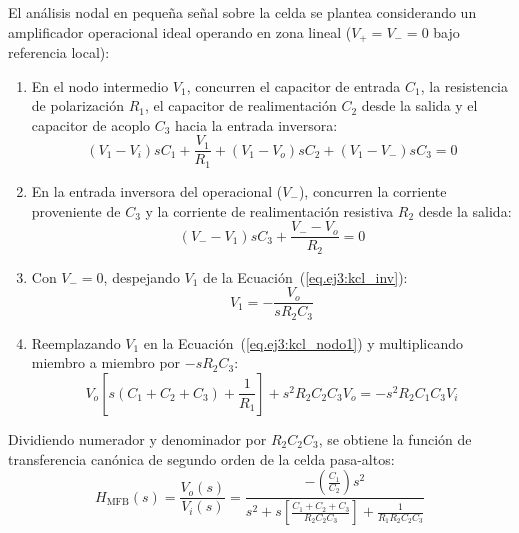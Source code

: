 El análisis nodal en pequeña señal sobre la celda se plantea considerando un amplificador operacional ideal operando en
zona lineal ($V_+ = V_- = 0$ bajo referencia local):
\begin{enumerate}
    \item En el nodo intermedio $V_1$, concurren el capacitor de entrada $C_1$, la resistencia de polarización $R_1$, el
        capacitor de realimentación $C_2$ desde la salida y el capacitor de acoplo $C_3$ hacia la entrada inversora:
        \begin{equation}
            \label{eq.ej3:kcl_nodo1}
            (V_1 - V_i) s C_1 + \frac{V_1}{R_1} + (V_1 - V_o) s C_2 + (V_1 - V_-) s C_3 = 0
        \end{equation}

    \item En la entrada inversora del operacional ($V_-$), concurren la corriente proveniente de $C_3$ y la corriente de
        realimentación resistiva $R_2$ desde la salida:
        \begin{equation}
            \label{eq.ej3:kcl_inv}
            (V_- - V_1) s C_3 + \frac{V_- - V_o}{R_2} = 0
        \end{equation}

    \item Con $V_- = 0$, despejando $V_1$ de la Ecuación~(\ref{eq.ej3:kcl_inv}):
        \begin{equation}
            V_1 = - \frac{V_o}{s R_2 C_3}
        \end{equation}

    \item Reemplazando $V_1$ en la Ecuación~(\ref{eq.ej3:kcl_nodo1}) y multiplicando miembro a miembro por $-s R_2 C_3$:
        \begin{equation*}
            V_o \left[ s(C_1 + C_2 + C_3) + \frac{1}{R_1} \right] + s^2 R_2 C_2 C_3 V_o = - s^2 R_2 C_1 C_3 V_i
        \end{equation*}
\end{enumerate}

Dividiendo numerador y denominador por $R_2 C_2 C_3$, se obtiene la función de transferencia canónica de segundo orden
de la celda pasa-altos:
\begin{equation}
    H_{\text{MFB}}(s) = \frac{V_o(s)}{V_i(s)} = \frac{- \left(\frac{C_1}{C_2}\right) s^2}{s^2 + s \left[ \frac{C_1 + C_2 + C_3}{R_2 C_2 C_3} \right] + \frac{1}{R_1 R_2 C_2 C_3}}
\end{equation}

